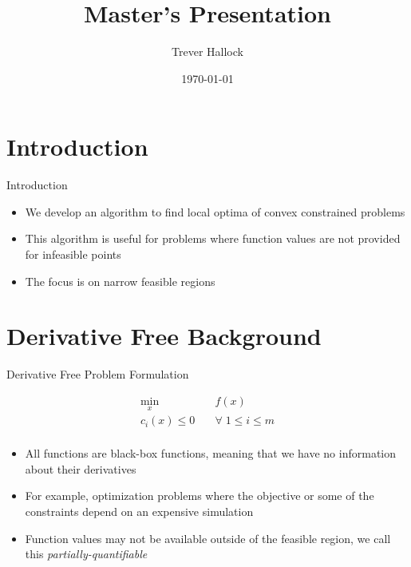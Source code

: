 \documentclass{beamer}
\begin{document}
\title{Master's Presentation}   
\author{Trever Hallock} 
\date{\today} 

\frame{\titlepage} 

\section{Introduction}

\begin{frame}{Introduction}
    \begin{itemize}
        \item We develop an algorithm to find local optima of convex constrained problems
        \item This algorithm is useful for problems where function values are not provided for infeasible points
        \item The focus is on narrow feasible regions
    \end{itemize}
\end{frame}

\section{Derivative Free Background}

\begin{frame}{Derivative Free Problem Formulation}
\begin{center}
\label{Problem}
\begin{align*}
\min_x & \quad f(x) \\
  c_i(x) \le 0   & \quad \forall \; 1 \le i \le m \\
\end{align*}
\end{center}
    \begin{itemize}
        \item All functions are black-box functions, meaning that we have no information about their derivatives
        \item For example, optimization problems where the objective or some of the constraints depend on an expensive simulation
        \item Function values may not be available outside of the feasible region, we call this \emph{partially-quantifiable}
    \end{itemize}
\end{frame}
\end{document}
